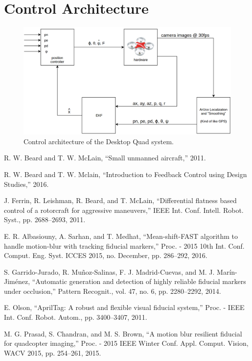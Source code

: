 \documentclass[dvips,12pt]{article}
\begin{document}
\section{Control Architecture}

\begin{figure}[H]
	\centering
	\includegraphics[width=\textwidth]{desktopquad_control_arch}
	\caption{Control architecture of the Desktop Quad system.}
	\label{fig:architecture}
\end{figure}


\begin{thebibliography}{9}
\singlespace

 R. W. Beard and T. W. McLain, “Small unmanned aircraft,” 2011.

 R. W. Beard and T. W. Mclain, “Introduction to Feedback Control using Design Studies,” 2016.

 J. Ferrin, R. Leishman, R. Beard, and T. McLain, “Differential flatness based control of a rotorcraft for aggressive maneuvers,” IEEE Int. Conf. Intell. Robot. Syst., pp. 2688–2693, 2011.

 E. R. Albasiouny, A. Sarhan, and T. Medhat, “Mean-shift-FAST algorithm to handle motion-blur with tracking fiducial markers,” Proc. - 2015 10th Int. Conf. Comput. Eng. Syst. ICCES 2015, no. December, pp. 286–292, 2016.

 S. Garrido-Jurado, R. Muñoz-Salinas, F. J. Madrid-Cuevas, and M. J. Marín-Jiménez, “Automatic generation and detection of highly reliable fiducial markers under occlusion,” Pattern Recognit., vol. 47, no. 6, pp. 2280–2292, 2014.

 E. Olson, “AprilTag: A robust and flexible visual fiducial system,” Proc. - IEEE Int. Conf. Robot. Autom., pp. 3400–3407, 2011.

 M. G. Prasad, S. Chandran, and M. S. Brown, “A motion blur resilient fiducial for quadcopter imaging,” Proc. - 2015 IEEE Winter Conf. Appl. Comput. Vision, WACV 2015, pp. 254–261, 2015.

\end{thebibliography}
\end{document}
